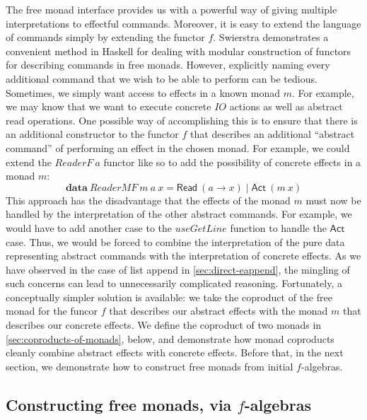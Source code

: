 \documentclass{jfp1}
\newcommand{\kw}[1]{\textbf{#1}}
\begin{document}
The free monad interface provides us with a powerful way of giving
multiple interpretations to effectful commands. Moreover, it is easy
to extend the language of commands simply by extending the functor
$f$. Swierstra \cite{swierstra08data} demonstrates a convenient method
in Haskell for dealing with modular construction of functors for
describing commands in free monads. However, explicitly naming every
additional command that we wish to be able to perform can be
tedious. Sometimes, we simply want access to effects in a known monad
$m$. For example, we may know that we want to execute concrete
$\mathit{IO}$ actions as well as abstract read operations. One
possible way of accomplishing this is to ensure that there is an
additional constructor to the functor $f$ that describes an additional
``abstract command'' of performing an effect in the chosen monad. For
example, we could extend the $\mathit{ReaderF}~a$ functor like so to
add the possibility of concrete effects in a monad $m$:
\begin{displaymath}
  \kw{data}~\mathit{ReaderMF}~m~a~x = \mathsf{Read}~(a \to x) \mathrel| \mathsf{Act}~(m~x)
\end{displaymath}
This approach has the disadvantage that the effects of the monad $m$
must now be handled by the interpretation of the other abstract
commands. For example, we would have to add another case to the
$\mathit{useGetLine}$ function to handle the $\mathsf{Act}$
case. Thus, we would be forced to combine the interpretation of the
pure data representing abstract commands with the interpretation of
concrete effects. As we have observed in the case of list append in
\autoref{sec:direct-eappend}, the mingling of such concerns can lead
to unnecessarily complicated reasoning. Fortunately, a conceptually
simpler solution is available: we take the coproduct of the free monad
for the funcor $f$ that describes our abstract effects with the monad
$m$ that describes our concrete effects. We define the coproduct of
two monads in \autoref{sec:coproducts-of-monads}, below, and
demonstrate how monad coproducts cleanly combine abstract effects with
concrete effects. Before that, in the next section, we demonstrate how
to construct free monads from initial $f$-algebras.

\subsection{Constructing free monads, via $f$-algebras}
\label{sec:construct-free-monads}
\end{document}
